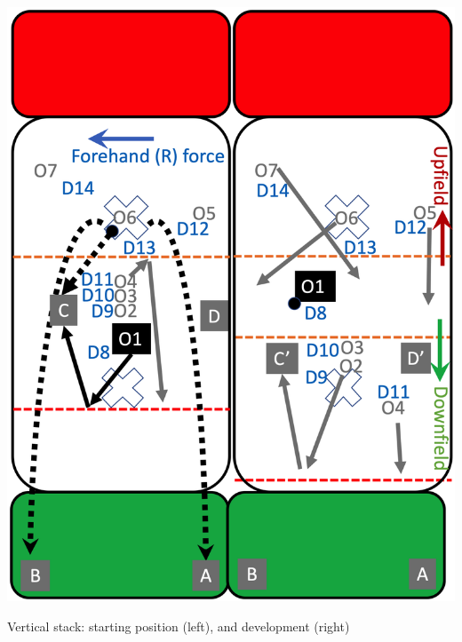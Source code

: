 \documentclass{tufte-handout}
\begin{document}
\begin{marginfigure}%
  \includegraphics[width=\linewidth]{O1-vertical}
  \caption{Vertical stack: 
  starting position (left),
  and development (right)}
  \label{fig:O1-vertical}
\end{marginfigure}
\end{document}
